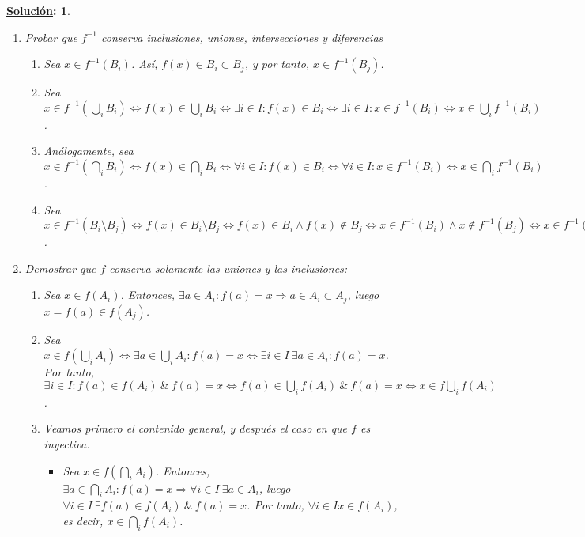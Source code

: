 \documentclass[10pt,a4paper,openright]{book}
\theoremstyle{break}
\newtheorem*{sol}{\underline{Solución}:}
\begin{document}
\begin{sol}
\begin{enumerate}[label={(\arabic*)}]
 \item Probar que $f^{-1}$ conserva inclusiones, uniones, intersecciones y diferencias
 \begin{enumerate}[label={(\alph*)}]
 \item Sea $x \in f^{-1}(B_i)$. Así, $f(x) \in B_i \subset B_j$, y por tanto, $x \in f^{-1}(B_j)$.
 \item Sea $x \in f^{-1}(\bigcup_i B_i) \Leftrightarrow f(x) \in \bigcup_i B_i \Leftrightarrow \exists i \in I : f(x) \in B_i \Leftrightarrow \exists i \in I : x \in f^{-1} (B_i) \Leftrightarrow x \in \bigcup_i f^{-1}(B_i)$.
 \item  Análogamente, sea $x \in f^{-1}(\bigcap_i B_i) \Leftrightarrow f(x) \in \bigcap_i B_i \Leftrightarrow \forall i \in I : f(x) \in B_i \Leftrightarrow \forall i \in I : x \in f^{-1} (B_i) \Leftrightarrow x \in \bigcap_i f^{-1}(B_i)$.
 \item  Sea $x \in f^{-1} (B_i \setminus B_j) \Leftrightarrow f(x) \in B_i \setminus B_j \Leftrightarrow f(x) \in B_i \wedge f(x) \notin B_j \Leftrightarrow x \in  f^{-1}(B_i) \wedge x \notin  f^{-1}(B_j) \Leftrightarrow x \in  f^{-1}(B_i) \setminus  f^{-1}(B_j)$.
 \end{enumerate}
 \item Demostrar que $f$ conserva solamente las uniones y las inclusiones:
 \begin{enumerate}[label={(\alph*)}]
 \item  Sea $x \in f(A_i)$. Entonces, $\exists a \in A_i : f(a) = x \Rightarrow a \in A_i \subset A_j$, luego $x = f(a) \in f(A_j)$.
 \item Sea $x \in f(\bigcup_i A_i) \Leftrightarrow \exists a \in \bigcup_i A_i : f(a) = x \Leftrightarrow \exists i \in I \ \exists a \in A_i : f(a) = x$. Por tanto, $\exists i \in I : f(a) \in f(A_i) \ \& \ f(a) = x  \Leftrightarrow f(a) \in \bigcup_i f(A_i) \ \& \ f(a) = x \Leftrightarrow x \in f\bigcup_i f(A_i)$.
 \item Veamos primero el contenido general, y después el caso en que $f$ es inyectiva.
 \begin{itemize}
 \item Sea $x \in f(\bigcap_i A_i)$. Entonces, $\exists a \in \bigcap_i A_i : f(a) = x \Rightarrow \forall i \in I \ \exists a \in A_i$, luego $\forall i \in I \ \exists f(a) \in f(A_i) \ \& \ f(a) =x$. Por tanto, $\forall i \in I x \in f(A_i)$, es decir, $x \in \bigcap_i f(A_i)$.

\end{itemize}
\end{enumerate}
\end{enumerate}
\end{sol}
\end{document}
